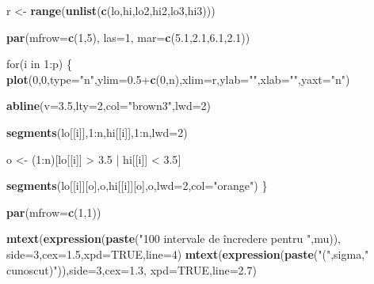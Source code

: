 \documentclass[]{article}
\newenvironment{Shaded}{\begin{snugshade}}{\end{snugshade}}
\newcommand{\KeywordTok}[1]{\textcolor[rgb]{0.13,0.29,0.53}{\textbf{{#1}}}}
\newcommand{\DataTypeTok}[1]{\textcolor[rgb]{0.13,0.29,0.53}{{#1}}}
\newcommand{\DecValTok}[1]{\textcolor[rgb]{0.00,0.00,0.81}{{#1}}}
\newcommand{\FloatTok}[1]{\textcolor[rgb]{0.00,0.00,0.81}{{#1}}}
\newcommand{\StringTok}[1]{\textcolor[rgb]{0.31,0.60,0.02}{{#1}}}
\newcommand{\OtherTok}[1]{\textcolor[rgb]{0.56,0.35,0.01}{{#1}}}
\newcommand{\NormalTok}[1]{{#1}}
\begin{document}
\begin{Shaded}
\begin{Highlighting}[]
\NormalTok{r <-}\StringTok{ }\KeywordTok{range}\NormalTok{(}\KeywordTok{unlist}\NormalTok{(}\KeywordTok{c}\NormalTok{(lo,hi,lo2,hi2,lo3,hi3)))}

\KeywordTok{par}\NormalTok{(}\DataTypeTok{mfrow=}\KeywordTok{c}\NormalTok{(}\DecValTok{1}\NormalTok{,}\DecValTok{5}\NormalTok{), }\DataTypeTok{las=}\DecValTok{1}\NormalTok{, }\DataTypeTok{mar=}\KeywordTok{c}\NormalTok{(}\FloatTok{5.1}\NormalTok{,}\FloatTok{2.1}\NormalTok{,}\FloatTok{6.1}\NormalTok{,}\FloatTok{2.1}\NormalTok{))}

\NormalTok{for(i in }\DecValTok{1}\NormalTok{:p) \{}
  \KeywordTok{plot}\NormalTok{(}\DecValTok{0}\NormalTok{,}\DecValTok{0}\NormalTok{,}\DataTypeTok{type=}\StringTok{"n"}\NormalTok{,}\DataTypeTok{ylim=}\FloatTok{0.5}\NormalTok{+}\KeywordTok{c}\NormalTok{(}\DecValTok{0}\NormalTok{,n),}\DataTypeTok{xlim=}\NormalTok{r,}\DataTypeTok{ylab=}\StringTok{""}\NormalTok{,}\DataTypeTok{xlab=}\StringTok{""}\NormalTok{,}\DataTypeTok{yaxt=}\StringTok{"n"}\NormalTok{)}
  
  \KeywordTok{abline}\NormalTok{(}\DataTypeTok{v=}\FloatTok{3.5}\NormalTok{,}\DataTypeTok{lty=}\DecValTok{2}\NormalTok{,}\DataTypeTok{col=}\StringTok{"brown3"}\NormalTok{,}\DataTypeTok{lwd=}\DecValTok{2}\NormalTok{)}
  
  \KeywordTok{segments}\NormalTok{(lo[[i]],}\DecValTok{1}\NormalTok{:n,hi[[i]],}\DecValTok{1}\NormalTok{:n,}\DataTypeTok{lwd=}\DecValTok{2}\NormalTok{)}
  
  \NormalTok{o <-}\StringTok{ }\NormalTok{(}\DecValTok{1}\NormalTok{:n)[lo[[i]] >}\StringTok{ }\FloatTok{3.5} \NormalTok{|}\StringTok{ }\NormalTok{hi[[i]] <}\StringTok{ }\FloatTok{3.5}\NormalTok{]}
  
  \KeywordTok{segments}\NormalTok{(lo[[i]][o],o,hi[[i]][o],o,}\DataTypeTok{lwd=}\DecValTok{2}\NormalTok{,}\DataTypeTok{col=}\StringTok{"orange"}\NormalTok{)}
\NormalTok{\}}

\KeywordTok{par}\NormalTok{(}\DataTypeTok{mfrow=}\KeywordTok{c}\NormalTok{(}\DecValTok{1}\NormalTok{,}\DecValTok{1}\NormalTok{))}

\KeywordTok{mtext}\NormalTok{(}\KeywordTok{expression}\NormalTok{(}\KeywordTok{paste}\NormalTok{(}\StringTok{"100 intervale de încredere pentru "}\NormalTok{,mu)),}
      \DataTypeTok{side=}\DecValTok{3}\NormalTok{,}\DataTypeTok{cex=}\FloatTok{1.5}\NormalTok{,}\DataTypeTok{xpd=}\OtherTok{TRUE}\NormalTok{,}\DataTypeTok{line=}\DecValTok{4}\NormalTok{)}
\KeywordTok{mtext}\NormalTok{(}\KeywordTok{expression}\NormalTok{(}\KeywordTok{paste}\NormalTok{(}\StringTok{"("}\NormalTok{,sigma,}\StringTok{" cunoscut)"}\NormalTok{)),}\DataTypeTok{side=}\DecValTok{3}\NormalTok{,}\DataTypeTok{cex=}\FloatTok{1.3}\NormalTok{,}
      \DataTypeTok{xpd=}\OtherTok{TRUE}\NormalTok{,}\DataTypeTok{line=}\FloatTok{2.7}\NormalTok{)}
\end{Highlighting}
\end{Shaded}
\end{document}
